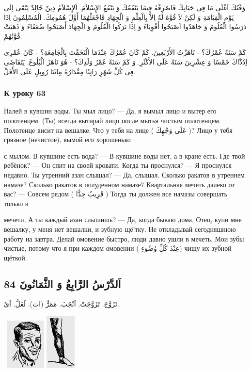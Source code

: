 \documentclass[a5paper]{article}
\begin{document}
وَقْتُكَ اَغْلَى مَا فِى حَيَاتِكَ فَاصْرِفْهُ فِيمَا يَنْفَعُكَ وَ يَنْفَعُ الإِسْلاَمَ. اَلإِسْلاَمُ دِينٌ خَالِدٌ يَبْقَى اِلَى يَوْمِ الْقِيَامَةِ وَ لَكِنْ لاَ قُوَّةَ لَهُ اِلاَّ بِالْعِلْمِ وَ الْجِهَادِ فَاجْعَلْهُمَا أَوَّلَ هُمُومِكَ. الْمُسْلِمُونَ اِذَا دَرَسُوا الْعُلُومَ وَ جَاهَدُوا اَصْبَحُوا أَقْوِيَاءَ وَ اِذَا تَرَكُوا الْعُلُومَ وَ الْجِهَادَ أَصْبَحُوا ضُعَفَاءَ وَ ذَهَبَتْ قُوَّتُهُمْ.

كَمْ سَنَةً عُمْرُكَ؟ - نَاهَزْتُ الأَرْبَعِينَ. كَمْ كَانَ عُمْرُكَ عِنْدَمَا الْتَحَقْتَ بِالْجَامِعَةِ؟ - كَانَ عُمْرِى اِذْذَّاكَ خَمْسًا وَ عِشْرِينَ سَنَةً عَلَى الأَكْثَرِ. وَ كَمْ سَنَةً عُمْرُ وَلَدِكَ؟ - هُوَ نَاهَزَ الْبُلُوغَ. يَتَقَاضَى فِى كُلِّ شَهْرٍ رَاتِبًا مِقْدَارُهُ مِائَتَا رُوبِلٍ عَلَى الأَقَلِّ.

\subsubsection{К уроку 63}
Налей в кувшин воды. Ты мыл лицо? — Да, я вымыл лицо и вытер его полотенцем. (Ты) всегда вытирай лицо после мытья чистым полотенцем. Полотенце висит на вешалке. Что у тебя на лице ( عَلَى وَجْهِكَ )? Лицо у тебя грязное (нечистое), вымой его хорошенько

с мылом. В кувшине есть вода? — В кувшине воды нет, а в кране есть. Где твой ребёнок? — Он спит на своей кровати. Когда ты проснулся? — Я проснулся недавно. Ты утренний азан слышал? — Да, слышал. Сколько ракатов в утреннем намазе? Сколько ракатов в полуденном намазе7 Квартальная мечеть далеко от вас? — Совсем рядом ( قَرِيبٌ جِدًّا ) Тогда ты должен все намазы совершать только в

мечети, А ты каждый азан слышишь? — Да, когда бываю дома. Отец, купи мне вешалку, у меня нет вешалки, и зубную щё'тку. Не откладывай сегодняшнюю работу на завтра. Делай омовение быстро, люди давно ушли в мечеть. Мои зубы чистые, потому что я при каждом омовении ( عِنْدَ كُلِّ وُضُوءِ) чищу их зубной щёткой.

\subsection{اَلدَّرْسُ الرَّابِعُ وَ الثَّمَانُونَ 84}
تَزَوَّجَ. تَزَوَّجَتْ. اَنْجَبَ. مَمَرٌّ (ات). لَعَلَّ. اَىْ. 

\  \includegraphics[width=0.7917in,height=1.0209in]{MuhammadBagauddinlatinized-img247.png}   \includegraphics[width=0.6043in,height=1.1252in]{MuhammadBagauddinlatinized-img248.png} 
\end{document}
